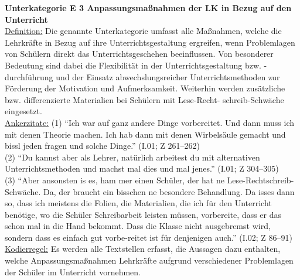 \noindent
\textbf{Unterkategorie E 3 Anpassungsmaßnahmen der LK in Bezug auf den Unterricht}\\
\underline{Definition:} Die genannte Unterkategorie umfasst alle Maßnahmen, welche die Lehrkräfte in Bezug auf ihre Unterrichtsgestaltung ergreifen, wenn Problemlagen von Schülern direkt das Unterrichtsgeschehen beeinflussen. Von besonderer Bedeutung sind dabei die Flexibilität in der Unterrichtsgestaltung bzw. -durchführung und der Einsatz abwechslungsreicher Unterrichtsmethoden zur Förderung der Motivation und Aufmerksamkeit. Weiterhin werden zusätzliche bzw. differenzierte Materialien bei Schülern mit Lese-Recht- schreib-Schwäche eingesetzt.\\
\underline{Ankerzitate:} (1) "`Ich war auf ganz andere Dinge vorbereitet. Und dann muss ich mit denen Theorie machen. Ich hab dann mit denen Wirbelsäule gemacht und bissl jeden fragen und solche Dinge."' (I.01; Z 261--262)\\ (2) "`Du kannst aber als Lehrer, natürlich arbeitest du mit alternativen Unterrichtsmethoden und machst mal dies und mal jenes."' (I.01; Z 304--305)\\ (3) "`Aber ansonsten is es, ham mer einen Schüler, der hat ne Lese-Rechtschreib-Schwäche. Da, der braucht ein bisschen ne besondere Behandlung. Da isses dann so, dass ich meistens die Folien, die Materialien, die ich für den Unterricht benötige, wo die Schüler Schreibarbeit leisten müssen, vorbereite, dass er das schon mal in die Hand bekommt. Dass die Klasse nicht ausgebremst wird, sondern dass es einfach gut vorbe-reitet ist für denjenigen auch."' (I.02; Z 86--91)\\
\underline{Kodierregel:} Es werden alle Textstellen erfasst, die Aussagen dazu enthalten, welche Anpassungsmaßnahmen Lehrkräfte aufgrund verschiedener Problemlagen der Schüler im Unterricht vornehmen.\\

